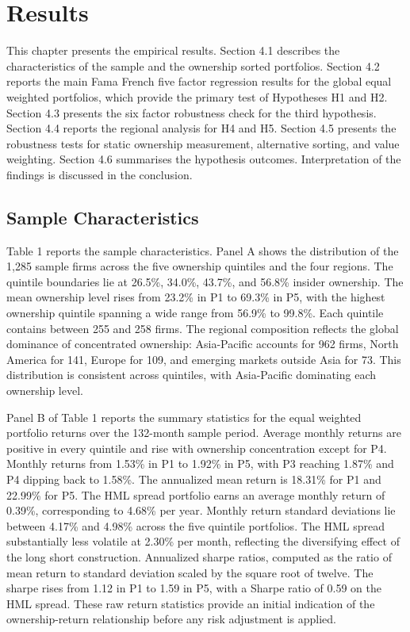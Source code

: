 
\section{Results}

This chapter presents the empirical results. Section 4.1 describes the characteristics of the sample and the ownership sorted portfolios. Section 4.2 reports the main Fama French five factor regression results for the global equal weighted portfolios, which provide the primary test of Hypotheses H1 and H2. Section 4.3 presents the six factor robustness check for the third hypothesis. Section 4.4 reports the regional analysis for H4 and H5. Section 4.5 presents the robustness tests for static ownership measurement, alternative sorting, and value weighting. Section 4.6 summarises the hypothesis outcomes. Interpretation of the findings is discussed in the conclusion.


\subsection{Sample Characteristics}

Table 1 reports the sample characteristics. Panel A shows the distribution of the 1,285 sample firms across the five ownership quintiles and the four regions. The quintile boundaries lie at 26.5\%, 34.0\%, 43.7\%, and 56.8\% insider ownership. The mean ownership level rises from 23.2\% in P1 to 69.3\% in P5, with the highest ownership quintile spanning a wide range from 56.9\% to 99.8\%. Each quintile contains between 255 and 258 firms. The regional composition reflects the global dominance of concentrated ownership: Asia-Pacific accounts for 962 firms, North America for 141, Europe for 109, and emerging markets outside Asia for 73. This distribution is consistent across quintiles, with Asia-Pacific dominating each ownership level.

Panel B of Table 1 reports the summary statistics for the equal weighted portfolio returns over the 132-month sample period. Average monthly returns are positive in every quintile and rise with ownership concentration except for P4. Monthly returns from 1.53\% in P1 to 1.92\% in P5, with P3 reaching 1.87\% and P4 dipping back to 1.58\%. The annualized mean return is 18.31\% for P1 and 22.99\% for P5. The HML spread portfolio earns an average monthly return of 0.39\%, corresponding to 4.68\% per year. Monthly return standard deviations lie between 4.17\% and 4.98\% across the five quintile portfolios. The HML spread substantially less volatile at 2.30\% per month, reflecting the diversifying effect of the long short construction. Annualized sharpe ratios, computed as the ratio of mean return to standard deviation scaled by the square root of twelve. The sharpe rises from 1.12 in P1 to 1.59 in P5, with a Sharpe ratio of 0.59 on the HML spread. These raw return statistics provide an initial indication of the ownership-return relationship before any risk adjustment is applied.

